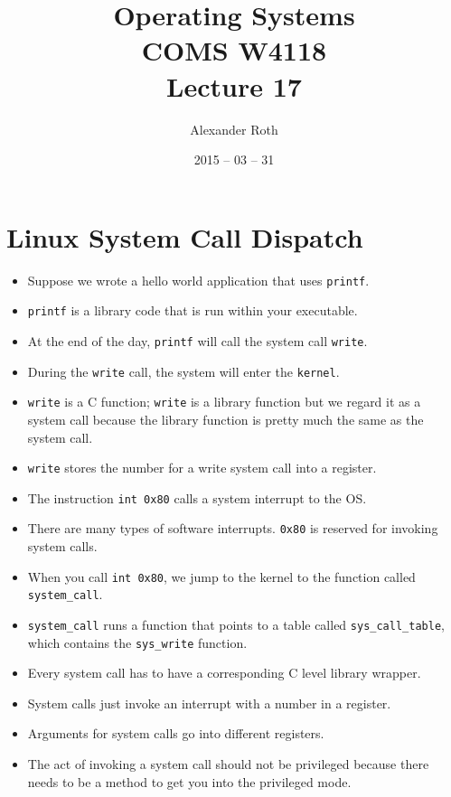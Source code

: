 \documentclass[]{article}
\begin{document}
\newcommand{\code}{\texttt}
\newtheorem{thm}{Theorem}
\title{Operating Systems \\ COMS W4118 \\ Lecture 17}
\author{Alexander Roth}
\date{2015 -- 03 -- 31}
\maketitle

\section{Linux System Call Dispatch}
\begin{itemize}
\item Suppose we wrote a hello world application that uses \code{printf}.
\item \code{printf} is a library code that is run within your executable.
\item At the end of the day, \code{printf} will call the system call
\code{write}.
\item During the \code{write} call, the system will enter the \code{kernel}.
\item \code{write} is a C function; \code{write} is a library function but we
regard it as a system call because the library function is pretty much the same
as the system call.
\item \code{write} stores the number for a write system call into a register.
\item The instruction \code{int 0x80} calls a system interrupt to the OS.
\item There are many types of software interrupts. \code{0x80} is reserved for
invoking system calls.
\item When you call \code{int 0x80}, we jump to the kernel to the function
called \code{system\_call}.
\item \code{system\_call} runs a function that points to a table called
\code{sys\_call\_table}, which contains the \code{sys\_write} function.
\item Every system call has to have a corresponding C level library wrapper.
\item System calls just invoke an interrupt with a number in a register.
\item Arguments for system calls go into different registers.
\item The act of invoking a system call should not be privileged because there
needs to be a method to get you into the privileged mode.
\end{itemize}
\end{document}
